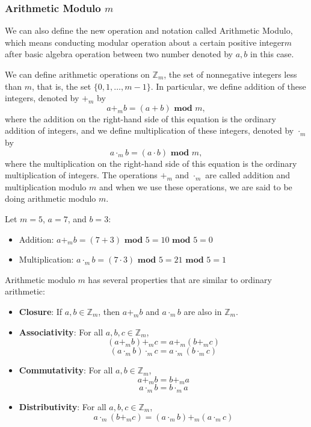     \subsubsection*{Arithmetic Modulo $m$}
    We can also define the new operation and notation called Arithmetic Modulo, which means conducting modular
    operation about a certain positive integer$m$ after basic algebra operation between two number denoted by $a,b$ in this case.
    \begin{definition}
        We can define arithmetic operations on \( \mathbb{Z}_m \), the set of nonnegative integers less than \( m \), that is, the set \( \{0, 1, \ldots, m - 1\} \). In particular, we define addition of these integers, denoted by \( +_m \) by
        \[ a +_m b = (a + b) \textbf{ mod } m, \]
        where the addition on the right-hand side of this equation is the ordinary addition of integers, and we define multiplication of these integers, denoted by \( \cdot_m \) by
        \[ a \cdot_m b = (a \cdot b) \textbf{ mod } m, \]
        where the multiplication on the right-hand side of this equation is the ordinary multiplication of integers. The operations \( +_m \) and \( \cdot_m \) are called addition and multiplication modulo \( m \) and when we use these operations, we are said to be doing arithmetic modulo \( m \).
    \end{definition}
    \begin{example}
        Let \( m = 5 \), \( a = 7 \), and \( b = 3 \):
        \begin{itemize}
            \item Addition: \( a +_m b = (7 + 3) \textbf{ mod } 5 = 10 \textbf{ mod } 5 = 0 \)
            \item Multiplication: \( a \cdot_m b = (7 \cdot 3) \textbf{ mod } 5 = 21 \textbf{ mod } 5 = 1 \)
        \end{itemize}
    \end{example}
    Arithmetic modulo \( m \) has several properties that are similar to ordinary arithmetic:
    \begin{itemize}
        \item \textbf{Closure}: If \( a, b \in \mathbb{Z}_m \), then \( a +_m b \) and \( a \cdot_m b \) are also in \( \mathbb{Z}_m \).
        \item \textbf{Associativity}: For all \( a, b, c \in \mathbb{Z}_m \),
        \[ (a +_m b) +_m c = a +_m (b +_m c) \]
        \[ (a \cdot_m b) \cdot_m c = a \cdot_m (b \cdot_m c) \]
        \item \textbf{Commutativity}: For all \( a, b \in \mathbb{Z}_m \),
        \[ a +_m b = b +_m a \]
        \[ a \cdot_m b = b \cdot_m a \]
        \item \textbf{Distributivity}: For all \( a, b, c \in \mathbb{Z}_m \),
        \[ a \cdot_m (b +_m c) = (a \cdot_m b) +_m (a \cdot_m c) \]
    \end{itemize}


